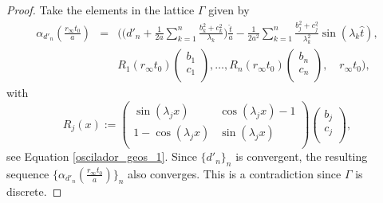 \documentclass[12pt]{amsart}
\theoremstyle{plain}
\theoremstyle{definition}
\theoremstyle{remark}
\begin{document}
\begin{proof}
	Take the elements in the lattice \( \Gamma \) given by
	\begin{eqnarray*}
		\alpha_{d'_n}\left(\frac{r_{\infty} t_0}{a}\right) &=& \Biggl( \biggl(d'_n + \frac{1}{2a} \sum_{k=1}^{n} \frac{b_k^2 + c_k^2}{\lambda_k}\biggr) \frac{\hat{t}}{a} - \frac{1}{2a^2} \sum_{k=1}^{n} \frac{b_j^2 + c_j^2}{\lambda_k^2} \sin(\lambda_k \hat{t}), \\ 
		&& R_1(r_{\infty} t_0) \left(\begin{matrix}
			b_1 \\
			c_1 \\
		\end{matrix}\right), \ldots, R_n(r_{\infty} t_0) \left(\begin{matrix}
			b_n \\
			c_n \\
		\end{matrix}\right), \quad r_{\infty} t_0 \Biggr),
    \end{eqnarray*}
	with
	\[
	R_j(x) := \left(\begin{matrix}
		\sin(\lambda_j x) & \cos(\lambda_j x) - 1 \\
		1 - \cos(\lambda_j x) & \sin(\lambda_j x) \\
	\end{matrix}\right)
	\left(\begin{matrix}
		b_j \\
		c_j \\
	\end{matrix}\right),
	\]
	see Equation \eqref{oscilador_geos_1}. Since \( \{d'_n\}_n \) is convergent, the resulting sequence \( \{\alpha_{d'_n}\left(\frac{r_{\infty} t_0}{a}\right)\}_n \) also converges. This is a contradiction since \( \Gamma \) is discrete.
	
	\end{proof}
	
		
		
		
	
\end{document}
